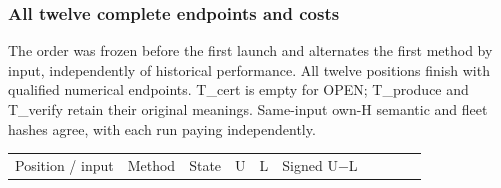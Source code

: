 \documentclass[
  american,
  11pt,
]{article}
\newcounter{none} %
\begin{document}
\begin{landscape}

\subsubsection{All twelve complete endpoints and
costs}\label{all-twelve-complete-endpoints-and-costs}

The order was frozen before the first launch and alternates the first
method by input, independently of historical performance. All twelve
positions finish with qualified numerical endpoints. T\_\allowbreak{}cert is empty
for OPEN; T\_\allowbreak{}produce and T\_\allowbreak{}verify retain their original meanings.
Same-input own-H semantic and fleet hashes agree, with each run paying
independently.

{\def\LTcaptype{none} %
\begin{longtable}[]{@{}
  >{\raggedright\arraybackslash}p{}
  >{\raggedright\arraybackslash}p{}
  >{\raggedright\arraybackslash}p{}
  >{\raggedright\arraybackslash}p{}
  >{\raggedright\arraybackslash}p{}
  >{\raggedright\arraybackslash}p{}
  >{\raggedright\arraybackslash}p{}
  >{\raggedright\arraybackslash}p{}
  >{\raggedright\arraybackslash}p{}
  >{\raggedright\arraybackslash}p{}@{}}
\toprule\noalign{}
\begin{minipage}[b]{\linewidth}\raggedright
Position / input
\end{minipage} & \begin{minipage}[b]{\linewidth}\raggedright
Method
\end{minipage} & \begin{minipage}[b]{\linewidth}\raggedright
State
\end{minipage} & \begin{minipage}[b]{\linewidth}\raggedright
U
\end{minipage} & \begin{minipage}[b]{\linewidth}\raggedright
L
\end{minipage} & \begin{minipage}[b]{\linewidth}\raggedright
Signed U−L

\end{minipage}
\end{longtable}}
\end{landscape}
\end{document}
